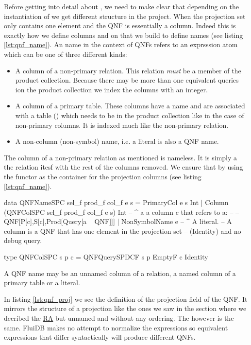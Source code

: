 Before getting into detail about , we need to make clear
that depending on the instantiation of  we get different
structure in the project. When  the projection set
only contains one element and the QNF is essentially a column. Indeed
this is exactly how we define columns and on that we build to define
names (see listing \ref{lst:qnf_name}). An name in the context of QNFs
refers to an exprsssion atom which can be one of three different
kinds:

\begin{itemize}
\item A column of a non-primary relation. This relation \emph{must} be
  a member of the product collection. Because there may be more than
  one equivalent queries ion the product collection we index the
  columns with an integer.
\item A column of a primary table. These columns have a name and are
  associated with a table () which needs to be in the product
  collection like in the case of non-primary columns. It is indexed
  much like the non-primary relation.
\item A non-column (non-symbol) name, i.e. a literal is also a QNF name.
\end{itemize}

The column of a non-primary relation as mentioned is nameless. It is
simply a the relation itesf with the rest of the columns removed. We
ensure that by using the  functor as the container for the
projection columns (see listing \ref{lst:qnf_name}).

\begin{code}
  \begin{haskellcode}
    data QNFNameSPC sel_f prod_f col_f e s =
      PrimaryCol e s Int
      | Column (QNFColSPC sel_f prod_f col_f e s) Int
      -- ^ a a column c that refers to a:
      --
      -- QNF[P[c],S[c],Prod[Query[a ~ QNF]]]
      | NonSymbolName e
      -- ^ A literal.
      -- A column is a QNF that has one element in the projection set
      -- (Identity) and no debug query.

    type QNFColSPC s p c = QNFQuerySPDCF s p EmptyF c Identity
  \end{haskellcode}
  \label{lst:qnf_name}
  \caption{A QNF name may be an unnamed column of a
    relation, a named column of a primary table or a literal.}
\end{code}


In listing \ref{lst:qnf_proj} we see the definition of the projection
field of the QNF. It mirrors the structure of a projection like the
ones we saw in the section where we decribed the
\hyperref[sec:relational_algebra_semantics]{RA} but unnamed and
without any ordering. The  however is the same. FluiDB
makes no attempt to normalize the expressions so equivalent
expressions that differ syntactically will produce different QNFs.

